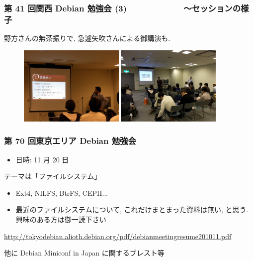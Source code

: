\documentclass[cjk,dvipdfmx,12pt,%
hyperref={bookmarks=true,bookmarksnumbered=true,bookmarksopen=false,%
colorlinks=false,%
pdftitle={第 42 回 関西 Debian 勉強会},%
pdfauthor={倉敷・のがた・佐々木},%
pdfsubject={資料},%
}]{beamer}
\begin{document}
\begin{frame}[fragile]
\frametitle{第 41 回関西 Debian 勉強会 (3)　　　　　　　〜セッションの様子}

野方さんの無茶振りで, 急遽矢吹さんによる御講演も.

\begin{figure}[h]
    \centering
    \includegraphics[width=0.45\textwidth]{image201012/kof2.jpg}
    \includegraphics[width=0.45\textwidth]{image201012/kof4.jpg}
 \end{figure}


\end{frame}

\begin{frame}[fragile]
\frametitle{第 70 回東京エリア Debian 勉強会}

\begin{itemize}
\item 日時: 11 月 20 日
\end{itemize}

\begin{block}{テーマは「ファイルシステム」}
  \begin{itemize}
    \item Ext4, NILFS, BtrFS, CEPH...
    \item 最近のファイルシステムについて, これだけまとまった資料は無い, と思う. 興味のある方は御一読下さい
  \end{itemize}
{\scriptsize{\url{http://tokyodebian.alioth.debian.org/pdf/debianmeetingresume201011.pdf}}}
\end{block}

他に Debian Miniconf in Japan に関するブレスト等

\end{frame}
\end{document}
